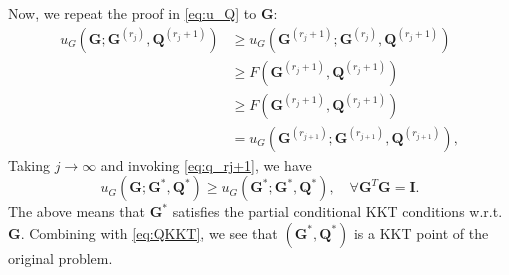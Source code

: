 \documentclass[10pt,journal]{IEEEtran}
\newcommand{\G}{\boldsymbol{G}}
\begin{document}
Now, we repeat the proof in \eqref{eq:u_Q} to ${\bm G}$:
\begin{subequations}\label{eq:u_G}
\begin{align*}
         u_G\left({\bm G};{\bm G}^{(r_j)},{\bm Q}^{(r_j+1)}\right) &\geq u_G\left({\bm G}^{(r_j+1)};{\bm G}^{(r_j)},{\bm Q}^{(r_j+1)}\right) \\
				                              &\geq F({\bm G}^{(r_j+1)},{\bm Q}^{(r_j+1)})\\					
                                               &\geq F\left({\bm G}^{(r_j+1)},{\bm Q}^{(r_j+1)}\right)  \\
											   & = u_G\left({\bm G}^{(r_{j+1})};{\bm G}^{(r_{j+1})},{\bm Q}^{(r_{j+1})}\right), 
\end{align*}
\end{subequations}
Taking $j\rightarrow \infty$ and invoking \eqref{eq:q_rj+1}, we have
\[ u_G\left({\bm G};{\bm G}^{\ast},{\bm Q}^{\ast}\right) \geq u_G\left({\bm G}^{\ast};{\bm G}^{\ast},{\bm Q}^{\ast}\right),\quad \forall \G^T\G={\bm I}. \]
The above means that $\G^\ast$ satisfies the partial conditional KKT conditions w.r.t. $\G$.
Combining with \eqref{eq:QKKT}, we see that $({\bm G}^\ast,{\bm Q}^\ast)$ is a KKT point of the original problem. 

\bigskip
\end{document}
